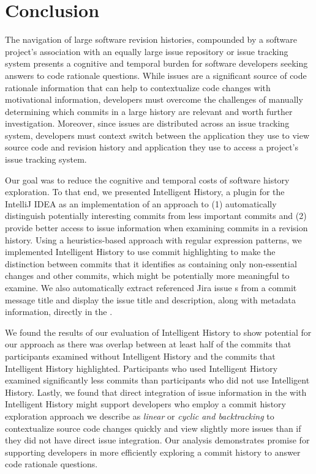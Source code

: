 \chapter{Conclusion}
\label{ch:Conclusion}

The navigation of large software revision histories, compounded by a software
project's association with an equally large issue repository or issue tracking system
presents a cognitive and temporal burden for software developers seeking 
answers to code rationale questions.
While issues are a significant source of code rationale information that
can help to contextualize code changes with motivational information,
developers must overcome the challenges of manually determining
which commits in a large history are relevant and worth further investigation.
Moreover, since issues are distributed across an issue tracking system,
developers must context switch between the application they use to view
source code and revision history and application they use to access a project's issue tracking system.

Our goal was to reduce the cognitive and temporal costs of software history exploration.
To that end, we presented Intelligent History, a plugin for the IntelliJ IDEA 
as an implementation of an approach to (1) automatically distinguish potentially interesting
commits from less important commits and (2) provide better access to issue information 
when examining commits in a revision history.
Using a heuristics-based approach with regular expression patterns, 
we implemented Intelligent History to use commit highlighting 
to make the distinction between commits that it identifies as containing
only non-essential changes and other commits, which might be potentially more meaningful to examine.
We also automatically extract referenced Jira issue s from a commit message title
and display the issue title and description, along with metadata information, directly in the .

We found the results of our evaluation of Intelligent History to show
potential for our approach as there was overlap between at least half of the commits
that participants examined without Intelligent History and the commits that Intelligent History
highlighted. Participants who used Intelligent History examined significantly
less commits than participants who did not use Intelligent History.
Lastly, we found that direct integration of issue information in the 
with Intelligent History might support developers who employ a commit history exploration approach
we describe as \textit{linear} or \textit{cyclic and backtracking} to contextualize
source code changes quickly and view slightly more issues than if they did not have
direct issue integration.
Our analysis demonstrates promise for supporting developers in more
efficiently exploring a commit history to answer code rationale questions.
